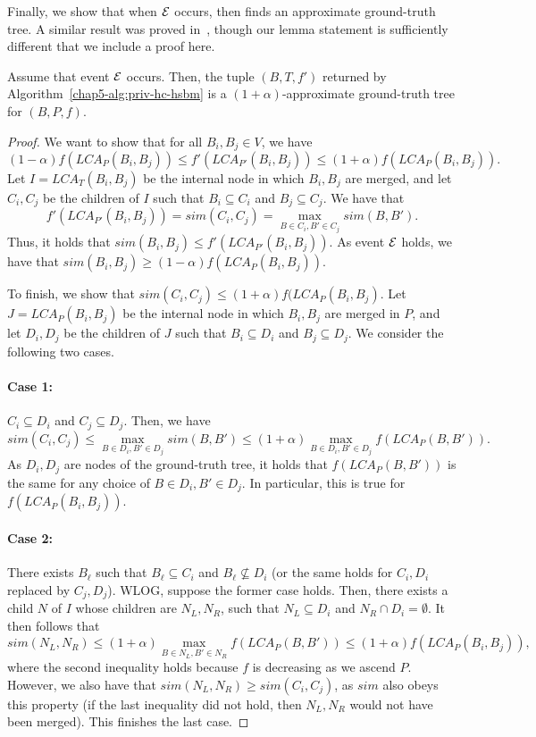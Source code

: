 Finally, we show that when $\mathcal{E}$ occurs, then \dphcblocks{} finds an approximate ground-truth tree. A similar result was proved in~\citet{cohen2019hierarchical}, though our lemma statement is sufficiently different that we include a proof here.
\begin{lem}\label{chap5-lem:approx-ground-truth}
Assume that event $\mathcal{E}$ occurs. Then, the tuple $(B, T, f')$ returned by Algorithm~\ref{chap5-alg:priv-hc-hsbm} is a $(1 + \alpha)$-approximate ground-truth tree for $(B, P, f)$.
\end{lem}
\begin{proof}
We want to show that for all $B_i, B_j \in V$, we have
\[
    (1-\alpha) f(LCA_P(B_i, B_j)) \leq f'(LCA_{P'}(B_i,B_j)) \leq (1+\alpha) f(LCA_P(B_i, B_j)).
\]
Let $I = LCA_{T}(B_i, B_j)$ be the internal node in which $B_i, B_j$ are merged, and let $C_i, C_j$ be the children of $I$ such that $B_i \subseteq C_i$ and $B_j \subseteq C_j$.
We have that
\[
    f'(LCA_{P'}(B_i, B_j)) = sim(C_i, C_j) = \max_{B \in C_i, B' \in C_j} sim (B, B').
\]
Thus, it holds that $sim(B_i, B_j) \leq f'(LCA_{P'}(B_i, B_j))$. As event $\mathcal{E}$ holds, we have that $sim(B_i, B_j) \geq (1-\alpha)f(LCA_P(B_i, B_j))$.

To finish, we show that $sim(C_i, C_j) \leq (1+\alpha) f(LCA_P(B_i, B_j)$.
Let $J = LCA_P(B_i, B_j)$ be the internal node in which $B_i, B_j$ are merged in $P$, and let $D_i, D_j$ be the children of $J$ such that $B_i \subseteq D_i$ and $B_j \subseteq D_j$. We consider the following two cases.
\paragraph{Case 1:} $C_i \subseteq D_i$ and $C_j \subseteq D_j$.
Then, we have 
\[
    sim(C_i, C_j) \leq \max_{B \in D_i, B' \in D_j} sim(B, B') \leq (1+\alpha) \max_{B \in D_i, B' \in D_j} f(LCA_P(B, B')).
\]
As $D_i, D_j$ are nodes of the ground-truth tree, it holds that $f(LCA_P(B, B'))$ is the same for any choice of $B \in D_i, B' \in D_j$. In particular, this is true for $f(LCA_P(B_i, B_j))$.

\paragraph{Case 2:} There exists $B_\ell$ such that $B_\ell \subseteq C_i$ and $B_\ell \nsubseteq D_i$ (or the same holds for $C_i, D_i$ replaced by $C_j, D_j$).
WLOG, suppose the former case holds. Then, there exists a child $N$ of $I$ whose children are $N_L, N_R$, such that $N_L \subseteq D_i$ and $N_R \cap D_i = \emptyset$. It then follows that 
\[
    sim(N_L, N_R) \leq (1+\alpha) \max_{B \in N_L, B' \in N_R} f(LCA_P(B, B')) \leq (1+\alpha) f(LCA_P(B_i, B_j)),
\]
where the second inequality holds because $f$ is decreasing as we ascend $P$.
However, we also have that $sim(N_L, N_R) \geq sim(C_i, C_j)$, as $sim$ also obeys this property (if the last inequality did not hold, then $N_L, N_R$ would not have been merged). This finishes the last case.
\end{proof}

